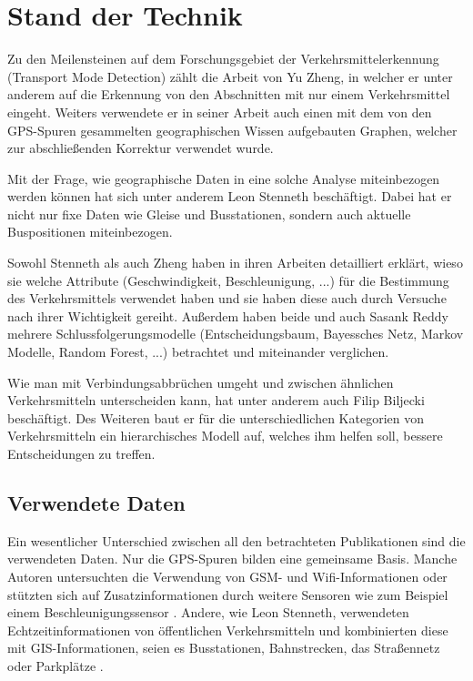 \chapter{Stand der Technik}
Zu den Meilensteinen auf dem Forschungsgebiet der Verkehrsmittelerkennung (Transport Mode Detection) zählt die Arbeit von Yu Zheng, in welcher er unter anderem auf die Erkennung von den Abschnitten mit nur einem Verkehrsmittel eingeht. Weiters verwendete er in seiner Arbeit auch einen mit dem von den GPS-Spuren gesammelten geographischen Wissen aufgebauten Graphen, welcher zur abschließenden Korrektur verwendet wurde.\cite{zheng_understanding_2010} \cite{zheng_understanding_2008} \cite{zheng_learning_2008}

Mit der Frage, wie geographische Daten in eine solche Analyse miteinbezogen werden können hat sich unter anderem Leon Stenneth beschäftigt. Dabei hat er nicht nur fixe Daten wie Gleise und Busstationen, sondern auch aktuelle Buspositionen miteinbezogen. \cite{stenneth_transportation_2011}

Sowohl Stenneth als auch Zheng haben in ihren Arbeiten detailliert erklärt, wieso sie welche Attribute (Geschwindigkeit, Beschleunigung, ...) für die Bestimmung des Verkehrsmittels verwendet haben und sie haben diese auch durch Versuche nach ihrer Wichtigkeit gereiht. Außerdem haben beide und auch Sasank Reddy \cite{reddy_determining_2008} mehrere Schlussfolgerungsmodelle (Entscheidungsbaum, Bayessches Netz, Markov Modelle, Random Forest, ...) betrachtet und miteinander verglichen. 

Wie man mit Verbindungsabbrüchen umgeht und zwischen ähnlichen Verkehrsmitteln unterscheiden kann, hat unter anderem auch Filip Biljecki beschäftigt. Des Weiteren baut er für die unterschiedlichen Kategorien von Verkehrsmitteln ein hierarchisches Modell auf, welches ihm helfen soll, bessere Entscheidungen zu treffen. \cite{biljecki_transportation_2013}

\section{Verwendete Daten}
Ein wesentlicher Unterschied zwischen all den betrachteten Publikationen sind die verwendeten Daten. Nur die GPS-Spuren bilden eine gemeinsame Basis. Manche Autoren untersuchten die Verwendung von GSM- und Wifi-Informationen \cite{reddy_using_2010} oder stützten sich auf Zusatzinformationen durch weitere Sensoren wie zum Beispiel einem Beschleunigungssensor \cite{reddy_using_2010}  \cite{nadine_schussler_improving_2011}. Andere, wie Leon Stenneth, verwendeten Echtzeitinformationen von öffentlichen Verkehrsmitteln und kombinierten diese mit GIS-Informationen, seien es Busstationen, Bahnstrecken, das Straßennetz oder Parkplätze \cite{stenneth_transportation_2011}.


